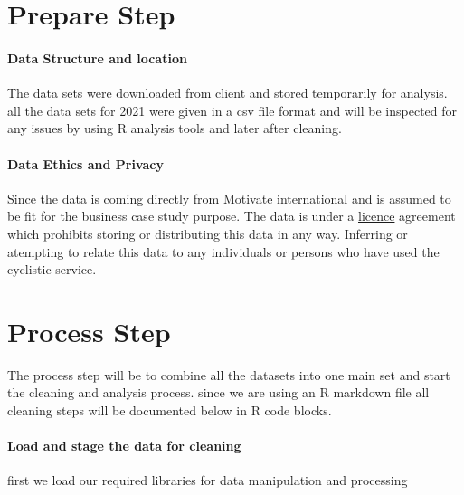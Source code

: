\documentclass[
]{article}
\begin{document}
\hypertarget{prepare-step}{%
\section{Prepare Step}\label{prepare-step}}

\hypertarget{data-structure-and-location}{%
\paragraph{Data Structure and
location}\label{data-structure-and-location}}

The data sets were downloaded from client and stored temporarily for
analysis. all the data sets for 2021 were given in a csv file format and
will be inspected for any issues by using R analysis tools and later
after cleaning.

\hypertarget{data-ethics-and-privacy}{%
\paragraph{Data Ethics and Privacy}\label{data-ethics-and-privacy}}

Since the data is coming directly from Motivate international and is
assumed to be fit for the business case study purpose. The data is under
a \href{https://ride.divvybikes.com/data-license-agreement}{licence}
agreement which prohibits storing or distributing this data in any way.
Inferring or atempting to relate this data to any individuals or persons
who have used the cyclistic service.

\hypertarget{process-step}{%
\section{Process Step}\label{process-step}}

The process step will be to combine all the datasets into one main set
and start the cleaning and analysis process. since we are using an R
markdown file all cleaning steps will be documented below in R code
blocks.

\hypertarget{load-and-stage-the-data-for-cleaning}{%
\paragraph{Load and stage the data for
cleaning}\label{load-and-stage-the-data-for-cleaning}}

first we load our required libraries for data manipulation and
processing
\end{document}
